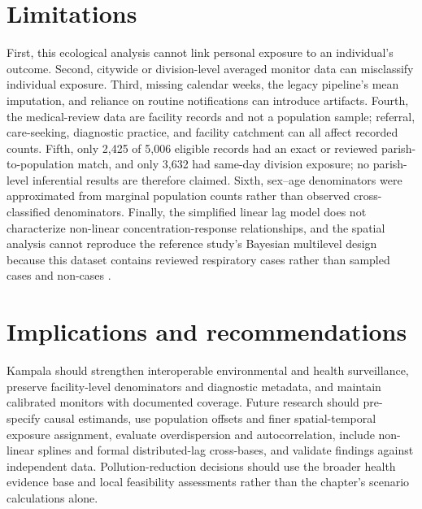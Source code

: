 \documentclass[12pt,a4paper]{report}
\begin{document}
\section{Limitations}
First, this ecological analysis cannot link personal exposure to an individual's outcome. Second, citywide or division-level averaged monitor data can misclassify individual exposure. Third, missing calendar weeks, the legacy pipeline's mean imputation, and reliance on routine notifications can introduce artifacts. Fourth, the medical-review data are facility records and not a population sample; referral, care-seeking, diagnostic practice, and facility catchment can all affect recorded counts. Fifth, only 2,425 of 5,006 eligible records had an exact or reviewed parish-to-population match, and only 3,632 had same-day division exposure; no parish-level inferential results are therefore claimed. Sixth, sex--age denominators were approximated from marginal population counts rather than observed cross-classified denominators. Finally, the simplified linear lag model does not characterize non-linear concentration-response relationships, and the spatial analysis cannot reproduce the reference study's Bayesian multilevel design because this dataset contains reviewed respiratory cases rather than sampled cases and non-cases \parencite{Adjorlolo2026}.

\section{Implications and recommendations}
Kampala should strengthen interoperable environmental and health surveillance, preserve facility-level denominators and diagnostic metadata, and maintain calibrated monitors with documented coverage. Future research should pre-specify causal estimands, use population offsets and finer spatial-temporal exposure assignment, evaluate overdispersion and autocorrelation, include non-linear splines and formal distributed-lag cross-bases, and validate findings against independent data. Pollution-reduction decisions should use the broader health evidence base and local feasibility assessments rather than the chapter's scenario calculations alone.
\end{document}

